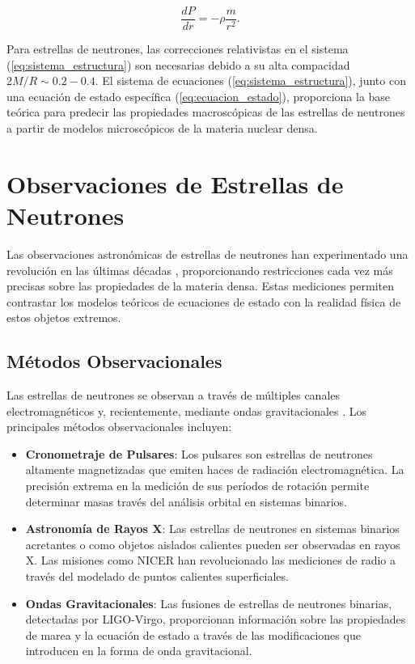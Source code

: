\begin{equation}
	\frac{dP}{dr} = -\rho \frac{m}{r^2}.
\end{equation}

Para estrellas de neutrones, las correcciones relativistas en el sistema (\ref{eq:sistema_estructura}) son necesarias debido a su alta compacidad $2M/R \sim 0.2-0.4$. El sistema de ecuaciones (\ref{eq:sistema_estructura}), junto con una ecuación de estado específica (\ref{eq:ecuacion_estado}), proporciona la base teórica para predecir las propiedades macroscópicas de las estrellas de neutrones a partir de modelos microscópicos de la materia nuclear densa.

\section{Observaciones de Estrellas de Neutrones}

Las observaciones astronómicas de estrellas de neutrones han experimentado una revolución en las últimas décadas \cite{pianMergersBinaryNeutron2021}, proporcionando restricciones cada vez más precisas sobre las propiedades de la materia densa. Estas mediciones permiten contrastar los modelos teóricos de ecuaciones de estado con la realidad física de estos objetos extremos.

\subsection{Métodos Observacionales}

Las estrellas de neutrones se observan a través de múltiples canales electromagnéticos \cite{glendenningCompactStarsNuclear2000} y, recientemente, mediante ondas gravitacionales \cite{fonsecaRefinedMassGeometric2021}. Los principales métodos observacionales incluyen:

\begin{itemize}
	\item \textbf{Cronometraje de Pulsares}: Los pulsares son estrellas de neutrones altamente magnetizadas que emiten haces de radiación electromagnética. La precisión extrema en la medición de sus períodos de rotación permite determinar masas través del análisis orbital en sistemas binarios.
	
	\item \textbf{Astronomía de Rayos X}: Las estrellas de neutrones en sistemas binarios acretantes o como objetos aislados calientes pueden ser observadas en rayos X. Las misiones como NICER han revolucionado las mediciones de radio a través del modelado de puntos calientes superficiales.
	
	\item \textbf{Ondas Gravitacionales}: Las fusiones de estrellas de neutrones binarias, detectadas por LIGO-Virgo, proporcionan información sobre las propiedades de marea y la ecuación de estado a través de las modificaciones que introducen en la forma de onda gravitacional.
\end{itemize}

